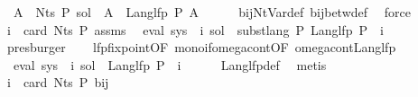 \begin{isabellebody}
\ {\isacharasterisk}{\kern0pt}{\isacharcolon}{\kern0pt}\ {\isachardoublequoteopen}{\isasymforall}A\ {\isasymin}\ Nts\ P{\isachardot}{\kern0pt}\ sol\ {\isacharparenleft}{\kern0pt}{\isasymgamma}{\isacharprime}{\kern0pt}\ A{\isacharparenright}{\kern0pt}\ {\isacharequal}{\kern0pt}\ Lang{\isacharunderscore}{\kern0pt}lfp\ P\ A{\isachardoublequoteclose}\isanewline
\ \ \ \ \isamarkupfalse%
\ bij{\isacharunderscore}{\kern0pt}Nt{\isacharunderscore}{\kern0pt}Var{\isacharunderscore}{\kern0pt}def\ bij{\isacharunderscore}{\kern0pt}betw{\isacharunderscore}{\kern0pt}def\ \isamarkupfalse%
\ force\isanewline
\ \ \isamarkupfalse%
\ {\isacartoucheopen}i\ {\isacharless}{\kern0pt}\ card\ {\isacharparenleft}{\kern0pt}Nts\ P{\isacharparenright}{\kern0pt}{\isacartoucheclose}\ assms\ \isamarkupfalse%
\ {\isachardoublequoteopen}eval\ {\isacharparenleft}{\kern0pt}sys\ {\isacharbang}{\kern0pt}\ i{\isacharparenright}{\kern0pt}\ sol\ {\isacharequal}{\kern0pt}\ subst{\isacharunderscore}{\kern0pt}lang\ P\ {\isacharparenleft}{\kern0pt}Lang{\isacharunderscore}{\kern0pt}lfp\ P{\isacharparenright}{\kern0pt}\ {\isacharparenleft}{\kern0pt}{\isasymgamma}\ i{\isacharparenright}{\kern0pt}{\isachardoublequoteclose}\isanewline
\ \ \ \ \isamarkupfalse%
\ presburger\isanewline
\ \ \isamarkupfalse%
\ lfp{\isacharunderscore}{\kern0pt}fixpoint{\isacharbrackleft}{\kern0pt}OF\ mono{\isacharunderscore}{\kern0pt}if{\isacharunderscore}{\kern0pt}omega{\isacharunderscore}{\kern0pt}cont{\isacharbrackleft}{\kern0pt}OF\ omega{\isacharunderscore}{\kern0pt}cont{\isacharunderscore}{\kern0pt}Lang{\isacharunderscore}{\kern0pt}lfp{\isacharbrackright}{\kern0pt}{\isacharbrackright}{\kern0pt}\ \isamarkupfalse%
\ {}{\isacharcolon}{\kern0pt}\ {\isachardoublequoteopen}eval\ {\isacharparenleft}{\kern0pt}sys\ {\isacharbang}{\kern0pt}\ i{\isacharparenright}{\kern0pt}\ sol\ {\isacharequal}{\kern0pt}\ Lang{\isacharunderscore}{\kern0pt}lfp\ P\ {\isacharparenleft}{\kern0pt}{\isasymgamma}\ i{\isacharparenright}{\kern0pt}{\isachardoublequoteclose}\isanewline
\ \ \ \ \isamarkupfalse%
\ Lang{\isacharunderscore}{\kern0pt}lfp{\isacharunderscore}{\kern0pt}def\ \isamarkupfalse%
\ metis\isanewline
\ \ \isamarkupfalse%
\ {\isacartoucheopen}i\ {\isacharless}{\kern0pt}\ card\ {\isacharparenleft}{\kern0pt}Nts\ P{\isacharparenright}{\kern0pt}{\isacartoucheclose}\ bij{\isacharunderscore}{\kern0pt}{\isasymgamma}{\isacharunderscore}{\kern0pt}{\isasymgamma}{\isacharprime}{\kern0pt}\ \isamarkupfalse%

\end{isabellebody}
